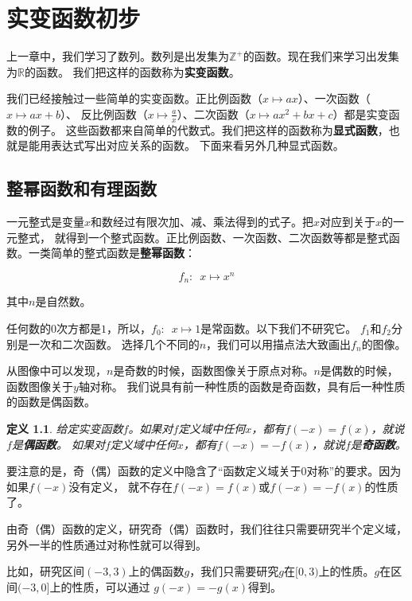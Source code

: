 \documentclass[12pt,UTF8]{ctexbook}
\newtheorem{df}{定义}[section]
\begin{document}
\chapter{实变函数初步}

上一章中，我们学习了数列。数列是出发集为$\mathbb{Z}^+$的函数。现在我们来学习出发集为$\mathbb{R}$的函数。
我们把这样的函数称为\textbf{实变函数}。

我们已经接触过一些简单的实变函数。正比例函数（$x\mapsto ax$）、一次函数（$x\mapsto ax + b$）、
反比例函数（$x\mapsto \frac{a}{x}$）、二次函数（$x\mapsto ax^2 + bx + c$）都是实变函数的例子。
这些函数都来自简单的代数式。我们把这样的函数称为\textbf{显式函数}，也就是能用表达式写出对应关系的函数。
下面来看另外几种显式函数。

\section{整幂函数和有理函数}

一元整式是变量$x$和数经过有限次加、减、乘法得到的式子。把$x$对应到关于$x$的一元整式，
就得到一个整式函数。正比例函数、一次函数、二次函数等都是整式函数。一类简单的整式函数是\textbf{整幂函数}：

$$f_n: \,\,\, x \mapsto x^n$$

其中$n$是自然数。

任何数的$0$次方都是$1$，所以，$f_0:\,\,\, x\mapsto 1$是常函数。以下我们不研究它。
$f_1$和$f_2$分别是一次和二次函数。
选择几个不同的$n$，我们可以用描点法大致画出$f_n$的图像。


从图像中可以发现，$n$是奇数的时候，函数图像关于原点对称。$n$是偶数的时候，函数图像关于$y$轴对称。
我们说具有前一种性质的函数是奇函数，具有后一种性质的函数是偶函数。
\begin{df}
    给定实变函数$f$。如果对$f$定义域中任何$x$，都有$f(-x) = f(x)$，就说$f$是\textbf{偶函数}。
如果对$f$定义域中任何$x$，都有$f(-x) = -f(x)$，就说$f$是\textbf{奇函数}。
\end{df}

要注意的是，奇（偶）函数的定义中隐含了“函数定义域关于$0$对称”的要求。因为如果$f(-x)$没有定义，
就不存在$f(-x) = f(x)$或$f(-x) = -f(x)$的性质了。

由奇（偶）函数的定义，研究奇（偶）函数时，我们往往只需要研究半个定义域，另外一半的性质通过对称性就可以得到。

比如，研究区间$(-3, 3)$上的偶函数$g$，我们只需要研究$g$在$[0, 3)$上的性质。$g$在区间$(-3,0]$上的性质，可以通过
$g(-x) = -g(x)$得到。
\end{document}
